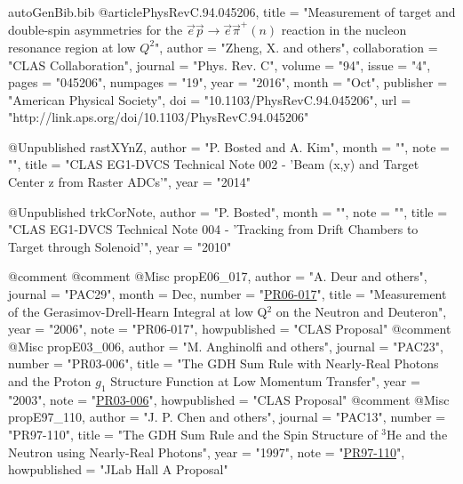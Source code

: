 \begin{filecontents*}{autoGenBib.bib}
@article{PhysRevC.94.045206,
  title = "{Measurement of target and double-spin asymmetries for the $\vec{e}\vec{p} \rightarrow \vec{e}\vec{\pi}^{+}(n)$ reaction in the nucleon resonance region at low ${Q}^{2}$}",  
  author = "Zheng, X. and others",
  collaboration = "CLAS Collaboration",
  journal = "Phys. Rev. C",
  volume = "94",
  issue = "4",
  pages = "045206",
  numpages = "19",
  year = "2016",
  month = "Oct",
  publisher = "American Physical Society",
  doi = "10.1103/PhysRevC.94.045206",
  url = "http://link.aps.org/doi/10.1103/PhysRevC.94.045206"
}

@Unpublished{ rastXYnZ,
	author = "P. Bosted and A. Kim",
	month = "",
	note = "",
	title = "{CLAS EG1-DVCS Technical Note 002 - 'Beam (x,y) and Target Center z from Raster ADCs'}",
	year = "2014"
}

@Unpublished{ trkCorNote,
	author = "P. Bosted",
	month = "",
	note = "",
	title = "{CLAS EG1-DVCS Technical Note 004 - 'Tracking from Drift Chambers to Target through Solenoid'}",
	year = "2010"
}

@comment %
@comment %
@Misc{ propE06_017,
	author = "A. Deur and others",
	journal = "PAC29",
	month = Dec,
	number = "\href{http://www.jlab.org/exp_prog/proposals/06/PR06-017.pdf}{PR06-017}",
	title = "{Measurement of the Gerasimov-Drell-Hearn Integral at low Q$^{2}$ on the Neutron and Deuteron}",
	year = "2006",
	note = "PR06-017",
	howpublished = "CLAS Proposal"
}
@comment %
@Misc{ propE03_006,
	author = "{M. Anghinolfi and others}",
	journal = "PAC23",
	number = "PR03-006",
	title = "{The GDH Sum Rule with Nearly-Real Photons and the Proton $g_1$ Structure Function at Low Momentum Transfer}",
	year = "2003",
	note = "\href{http://www.jlab.org/exp_prog/proposals/03/PR03-006.pdf}{PR03-006}",
	howpublished = "CLAS Proposal"
}
@comment %
@Misc{ propE97_110,
	author = "{J. P. Chen and others}",
	journal = "PAC13",
	number = "PR97-110",
	title = "{The GDH Sum Rule and the Spin Structure of $^3$He and the Neutron using Nearly-Real Photons}",
	year = "1997",
	note = "\href{http://www.jlab.org/exp_prog/proposals/97/PR97-110.pdf}{PR97-110}",
	howpublished = "JLab Hall A Proposal"
}


\end{filecontents*}
